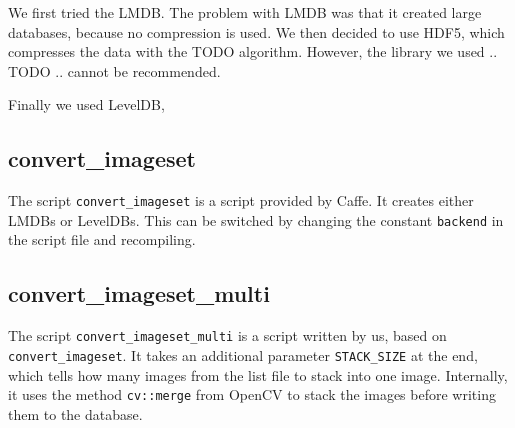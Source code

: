 We first tried the LMDB.
The problem with LMDB was that it created large databases, because no compression is used.
We then decided to use HDF5, which compresses the data with the TODO algorithm.
However, the library we used .. TODO .. cannot be recommended.

Finally we used LevelDB,


\subsection{convert\_imageset}
The script \texttt{convert\_imageset} is a script provided by Caffe.
It creates either LMDBs or LevelDBs.
This can be switched by changing the constant \texttt{backend} in the script file and recompiling.

\subsection{convert\_imageset\_multi}
The script \texttt{convert\_imageset\_multi} is a script written by us, based on \texttt{convert\_imageset}.
It takes an additional parameter \texttt{STACK\_SIZE} at the end, which tells how many images from the list file to stack into one image.
Internally, it uses the method \texttt{cv::merge} from OpenCV to stack the images before writing them to the database.